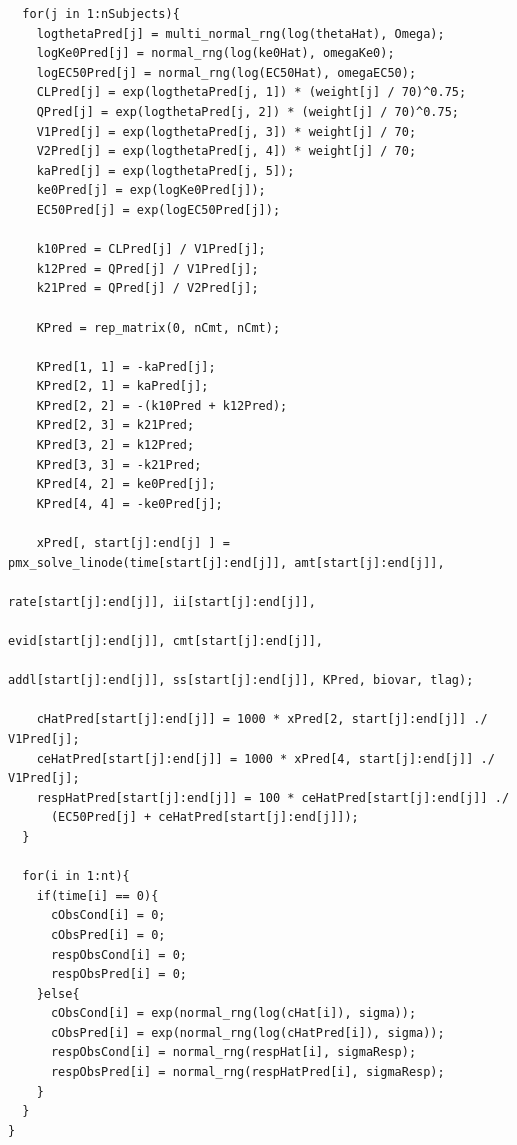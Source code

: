 \documentclass[10pt, reqno, oneside]{amsbook}
\numberwithin{equation}{chapter}
\numberwithin{figure}{chapter}
\numberwithin{table}{chapter}
\theoremstyle{remark}
\begin{document}
\begin{verbatim}
  for(j in 1:nSubjects){
    logthetaPred[j] = multi_normal_rng(log(thetaHat), Omega);
    logKe0Pred[j] = normal_rng(log(ke0Hat), omegaKe0);
    logEC50Pred[j] = normal_rng(log(EC50Hat), omegaEC50);
    CLPred[j] = exp(logthetaPred[j, 1]) * (weight[j] / 70)^0.75;
    QPred[j] = exp(logthetaPred[j, 2]) * (weight[j] / 70)^0.75;
    V1Pred[j] = exp(logthetaPred[j, 3]) * weight[j] / 70;
    V2Pred[j] = exp(logthetaPred[j, 4]) * weight[j] / 70;
    kaPred[j] = exp(logthetaPred[j, 5]);
    ke0Pred[j] = exp(logKe0Pred[j]);
    EC50Pred[j] = exp(logEC50Pred[j]);

    k10Pred = CLPred[j] / V1Pred[j];
    k12Pred = QPred[j] / V1Pred[j];
    k21Pred = QPred[j] / V2Pred[j];

    KPred = rep_matrix(0, nCmt, nCmt);

    KPred[1, 1] = -kaPred[j];
    KPred[2, 1] = kaPred[j];
    KPred[2, 2] = -(k10Pred + k12Pred);
    KPred[2, 3] = k21Pred;
    KPred[3, 2] = k12Pred;
    KPred[3, 3] = -k21Pred;
    KPred[4, 2] = ke0Pred[j];
    KPred[4, 4] = -ke0Pred[j];

    xPred[, start[j]:end[j] ] = pmx_solve_linode(time[start[j]:end[j]], amt[start[j]:end[j]],
                                                 rate[start[j]:end[j]], ii[start[j]:end[j]],
                                                 evid[start[j]:end[j]], cmt[start[j]:end[j]],
                                                 addl[start[j]:end[j]], ss[start[j]:end[j]], KPred, biovar, tlag);

    cHatPred[start[j]:end[j]] = 1000 * xPred[2, start[j]:end[j]] ./ V1Pred[j];
    ceHatPred[start[j]:end[j]] = 1000 * xPred[4, start[j]:end[j]] ./ V1Pred[j];
    respHatPred[start[j]:end[j]] = 100 * ceHatPred[start[j]:end[j]] ./
      (EC50Pred[j] + ceHatPred[start[j]:end[j]]);
  }

  for(i in 1:nt){
    if(time[i] == 0){
      cObsCond[i] = 0;
      cObsPred[i] = 0;
      respObsCond[i] = 0;
      respObsPred[i] = 0;
    }else{
      cObsCond[i] = exp(normal_rng(log(cHat[i]), sigma));
      cObsPred[i] = exp(normal_rng(log(cHatPred[i]), sigma));
      respObsCond[i] = normal_rng(respHat[i], sigmaResp);
      respObsPred[i] = normal_rng(respHatPred[i], sigmaResp);
    }
  }
}
\end{verbatim}
\end{document}
